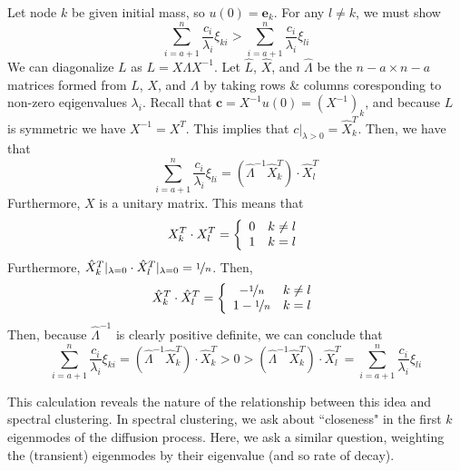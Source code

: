 \documentclass[10pt]{article}
\theoremstyle{definition}
\numberwithin{theorem}{section}
\numberwithin{definition}{section}
\numberwithin{lemma}{section}
\numberwithin{corollary}{section}
\numberwithin{clm}{section}
\numberwithin{rmk}{section}
\renewcommand{\b}{\bm}
\begin{document}
	Let node $k$ be given initial mass, so $u(0) = \b{e}_k$. For any $l \neq k$, we must show
	\begin{equation}\label{first_wins}
	\sum_{i =a+1}^n \frac{c_i}{\lambda_i}\xi_{ki} > \sum_{i =a+1}^n \frac{c_i}{\lambda_i}\xi_{li}
	\end{equation}
	We can diagonalize $L$ as $L = X\Lambda X^{-1}$. Let $\hat{L}$, $\hat{X}$, and $\hat{\Lambda}$ be the $n-a\times n-a$ matrices formed from $L$, $X$, and $\Lambda$ by taking rows \& columns coresponding to non-zero eqigenvalues $\lambda_i$. Recall that $\b{c} = X^{-1}u(0) = (X^{-1})_k$, and because $L$ is symmetric we have $X^{-1} = X^T$. This implies that $c|_{\lambda >0} = \hat{X}^T_k$. Then, we have that
	\begin{equation}
	 \sum_{i =a+1}^n \frac{c_i}{\lambda_i}\xi_{li} = (\hat{\Lambda}^{-1} \hat{X}^T_k)\cdot \hat{X}^T_l
	 \end{equation}
	 Furthermore, $X$ is a unitary matrix. This means that 
	 \begin{equation}
	 X^T_k \cdot X^T_l = \left\{\begin{array}{c c}
	 0 & k \neq l \\
	 1 & k = l
	 \end{array}\right.
	 \end{equation}
	Furthermore, $ \hat{X}^T_k|_{\lambda = 0} \cdot \hat{X}^T_l|_{\lambda = 0} = \nicefrac{1}{n}$. Then,
	 \begin{equation}
	\hat{X}^T_k \cdot \hat{X}^T_l = \left\{\begin{array}{c c}
	-\nicefrac{1}{n} & k \neq l \\
	1 - \nicefrac{1}{n} & k = l
	\end{array}\right.
	\end{equation}
	Then, because $\hat{\Lambda}^{-1}$ is clearly positive definite, we can conclude that 
	\begin{equation}
	 \sum_{i =a+1}^n \frac{c_i}{\lambda_i}\xi_{ki} = (\hat{\Lambda}^{-1} \hat{X}^T_k)\cdot \hat{X}^T_k > 0>   (\hat{\Lambda}^{-1} \hat{X}^T_k)\cdot \hat{X}^T_l = \sum_{i =a+1}^n \frac{c_i}{\lambda_i}\xi_{li} 
	\end{equation}
	
	This calculation reveals the nature of the relationship between this idea and spectral clustering. In spectral clustering, we ask about ``closeness" in the first $k$ eigenmodes of the diffusion process. Here, we ask a similar question, weighting the (transient) eigenmodes by their eigenvalue (and so rate of decay).
\end{document}
